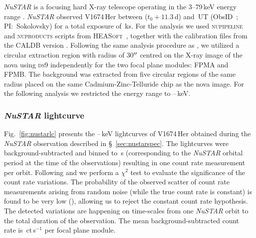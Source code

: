 \documentclass[a4paper,fleqn,usenatbib]{mnras}
\newcommand{\nova}{V1674\,Her}
\newcommand{\tnustarep}{$t_0+11.3$\,d}
\begin{document}
{\em NuSTAR} is a focusing hard X-ray telescope operating in the 3--79\,keV
energy range \citep{2013ApJ...770..103H,2015ApJS..220....8M}.
{\em NuSTAR} observed \nova{} between 
\nustarobsstartutc{} (\tnustarep) 
and \nustarobsstoputc{}\,UT 
(ObsID~\nustarobsid; PI:~Sokolovsky) for a total exposure of \nustarexpks{}\,ks. 
For the analysis we used \textsc{nupipeline} and \textsc{nuproducts} scripts from
\textsc{HEASoft\,\nustarheasoftver{}} \citep{2014ascl.soft08004N}, together
with the calibration files from the \textsc{CALDB} version \textsc{\nustarcaldbver{}}.
Following the same analysis procedure as \cite{2020MNRAS.497.2569S,2022MNRAS.514.2239S}, 
we utilized a circular extraction region with  radius of 30$\hbox{$^{\prime\prime}$}$ centred on the X-ray image of the nova using \textsc{ds9} \citep{2003ASPC..295..489J} 
independently for the two focal plane modules: FPMA and FPMB. The background was extracted from five circular regions 
of the same radius placed on the same Cadmium-Zinc-Telluride \citep[CZT;][]{2011hxra.book.....A} chip as the nova image.
For the following analysis we restricted the energy range to \nustarenergylow{}--\nustarenergyhigh{}\,keV.

%
\subsubsection{{\em NuSTAR} lightcurve}
\label{sec:nustarvar}

Fig.~\ref{fig:nustarlc} presents the \nustarenergylow{}--\nustarenergyhigh{}\,keV lightcurves of \nova{}
obtained during the {\em NuSTAR} observation described in \S~\ref{sec:nustarspec}. 
The lightcurves were background-subtracted and binned to 
\nustarorbitalperiodsec{}\,s (corresponding to the {\em NuSTAR}
orbital period at the time of the observations) 
resulting in one count rate measurement per orbit. 
%
Following \cite{2010AJ....139.1269D} and \cite{2017MNRAS.464..274S} we
perform a $\chi^2$ test to evaluate the significance of the count rate variations.
The probability of the observed scatter of count rate measurements arising from random noise
(while the true count rate is constant) is found to be very low (\nustarlcchiprob{}), 
allowing us to reject the constant count rate hypothesis.
%
The detected variations are happening on time-scales from one {\em NuSTAR} orbit to the total duration of the observation. 
%
The mean background-subtracted count rate is \nustarmeancountrateperfpm{}\,ct\,s$^{-1}$ per focal plane module.
\end{document}
